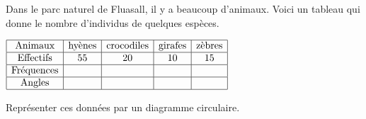 \begin{exercice*}
    Dans le parc naturel de Fluasall, il y a beaucoup d'animaux.
    Voici un tableau qui donne le nombre d'individus de quelques espèces.

    \medskip
    $
    \begin{array}{|c|c|c|c|c|}
    \hline
    \text{Animaux} & \text{hyènes} & \text{crocodiles} & \text{girafes} & \text{zèbres}\\
    \hline
    \text{Effectifs} & 55 & 20 & 10 & 15\\
    \hline
    \text{Fréquences} &   &   &   &  \\
    \hline
    \text{Angles} &   &   &   &  \\
    \hline
    \end{array}
    $


    \medskip
    Représenter ces données par un diagramme circulaire.

\end{exercice*}

